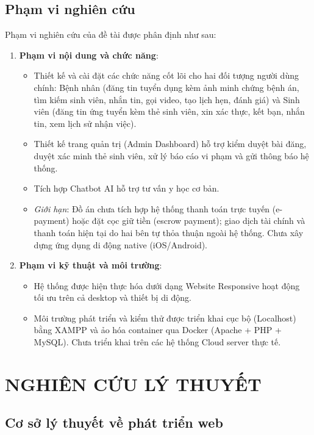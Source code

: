 \documentclass[13pt,a4paper]{extreport}
\begin{document}
\section{Phạm vi nghiên cứu}
Phạm vi nghiên cứu của đề tài được phân định như sau:
\begin{enumerate}
    \item \textbf{Phạm vi nội dung và chức năng}:
    \begin{itemize}
        \item Thiết kế và cài đặt các chức năng cốt lõi cho hai đối tượng người dùng chính: Bệnh nhân (đăng tin tuyển dụng kèm ảnh minh chứng bệnh án, tìm kiếm sinh viên, nhắn tin, gọi video, tạo lịch hẹn, đánh giá) và Sinh viên (đăng tin ứng tuyển kèm thẻ sinh viên, xin xác thực, kết bạn, nhắn tin, xem lịch sử nhận việc).
        \item Thiết kế trang quản trị (Admin Dashboard) hỗ trợ kiểm duyệt bài đăng, duyệt xác minh thẻ sinh viên, xử lý báo cáo vi phạm và gửi thông báo hệ thống.
        \item Tích hợp Chatbot AI hỗ trợ tư vấn y học cơ bản.
        \item \textit{Giới hạn}: Đồ án chưa tích hợp hệ thống thanh toán trực tuyến (e-payment) hoặc đặt cọc giữ tiền (escrow payment); giao dịch tài chính và thanh toán hiện tại do hai bên tự thỏa thuận ngoài hệ thống. Chưa xây dựng ứng dụng di động native (iOS/Android).
    \end{itemize}
    \item \textbf{Phạm vi kỹ thuật và môi trường}:
    \begin{itemize}
        \item Hệ thống được hiện thực hóa dưới dạng Website Responsive hoạt động tối ưu trên cả desktop và thiết bị di động.
        \item Môi trường phát triển và kiểm thử được triển khai cục bộ (Localhost) bằng XAMPP và ảo hóa container qua Docker (Apache + PHP + MySQL). Chưa triển khai trên các hệ thống Cloud server thực tế.
    \end{itemize}
\end{enumerate}

\newpage

\chapter{NGHIÊN CỨU LÝ THUYẾT}

\section{Cơ sở lý thuyết về phát triển web}
\end{document}
